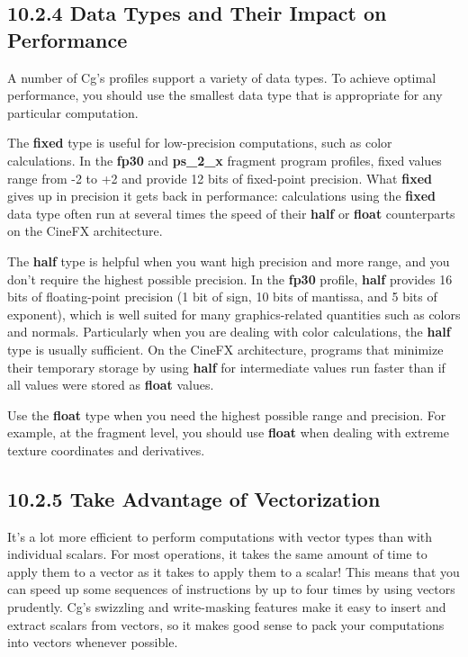 \documentclass[../main.tex]{subfiles}
\begin{document}
\subsection{10.2.4 Data Types and Their Impact on Performance}

A number of Cg's profiles support a variety of data types. To achieve optimal performance, you should use the smallest data type that is appropriate for any particular computation.

The \textbf{fixed} type is useful for low-precision computations, such as color calculations. In the \textbf{fp30} and \textbf{ps_2_x} fragment program profiles, fixed values range from -2 to +2 and provide 12 bits of fixed-point precision. What \textbf{fixed} gives up in precision it gets back in performance: calculations using the \textbf{fixed} data type often run at several times the speed of their \textbf{half} or \textbf{float} counterparts on the CineFX architecture.

The \textbf{half} type is helpful when you want high precision and more range, and you don't require the highest possible precision. In the \textbf{fp30} profile, \textbf{half} provides 16 bits of floating-point precision (1 bit of sign, 10 bits of mantissa, and 5 bits of exponent), which is well suited for many graphics-related quantities such as colors and normals. Particularly when you are dealing with color calculations, the \textbf{half} type is usually sufficient. On the CineFX architecture, programs that minimize their temporary storage by using \textbf{half} for intermediate values run faster than if all values were stored as \textbf{float} values.

Use the \textbf{float} type when you need the highest possible range and precision. For example, at the fragment level, you should use \textbf{float} when dealing with extreme texture coordinates and derivatives.

\subsection{10.2.5 Take Advantage of Vectorization}

It's a lot more efficient to perform computations with vector types than with individual scalars. For most operations, it takes the same amount of time to apply them to a vector as it takes to apply them to a scalar! This means that you can speed up some sequences of instructions by up to four times by using vectors prudently. Cg's swizzling and write-masking features make it easy to insert and extract scalars from vectors, so it makes good sense to pack your computations into vectors whenever possible.
\end{document}

